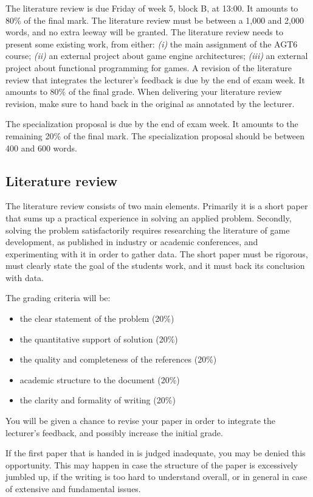 \documentclass{article}
\begin{document}
The literature review is due Friday of week 5, block B, at 13:00. It amounts to 80\% of the final mark. The literature review must be between a 1,000 and 2,000 words, and no extra leeway will be granted. The literature review needs to present some existing work, from either: \textit{(i)} the main assignment of the AGT6 course; \textit{(ii)} an external project about game engine architectures; \textit{(iii)} an external project about functional programming for games.
A revision of the literature review that integrates the lecturer's feedback is due by the end of exam week. It amounts to 80\% of the final grade. When delivering your literature review revision, make sure to hand back in the original as annotated by the lecturer.

The specialization proposal is due by the end of exam week. It amounts to the remaining 20\% of the final mark. The specialization proposal should be between 400 and 600 words.

\subsection{Literature review}
The literature review consists of two main elements. Primarily it is a short paper that sums up a practical experience in solving an applied problem. Secondly, solving the problem satisfactorily requires researching the literature of game development, as published in industry or academic conferences, and experimenting with it in order to gather data. The short paper must be rigorous, must clearly state the goal of the students work, and it must back its conclusion with data.

The grading criteria will be:
\begin{itemize}
\item the clear statement of the problem (20\%)
\item the quantitative support of solution (20\%)
\item the quality and completeness of the references (20\%)
\item academic structure to the document (20\%)
\item the clarity and formality of writing (20\%)
\end{itemize}

You will be given a chance to revise your paper in order to integrate the lecturer's feedback, and possibly increase the initial grade. 

If the first paper that is handed in is judged inadequate, you may be denied this opportunity. This may happen in case the structure of the paper is excessively jumbled up, if the writing is too hard to understand overall, or in general in case of extensive and fundamental issues.
 
\end{document}
